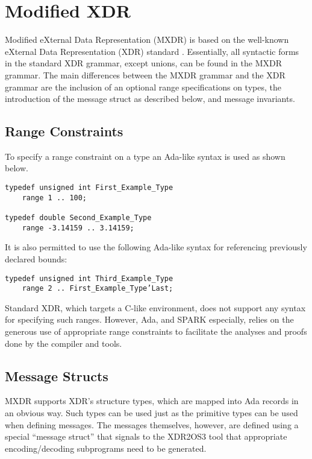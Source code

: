 
\section{Modified XDR}
\label{sec:mxdr}

Modified eXternal Data Representation (MXDR) is based on the well-known eXternal Data
Representation (XDR) standard \cite{rfc-4506}. Essentially, all syntactic forms in the standard
XDR grammar, except unions, can be found in the MXDR grammar. The main differences between the
MXDR grammar and the XDR grammar are the inclusion of an optional range specifications on types,
the introduction of the message struct as described below, and message invariants.


\subsection{Range Constraints}

To specify a range constraint on a type an Ada-like syntax is used as shown below.

\begin{Verbatim}
typedef unsigned int First_Example_Type
    range 1 .. 100;

typedef double Second_Example_Type
    range -3.14159 .. 3.14159;
\end{Verbatim}

It is also permitted to use the following Ada-like syntax for referencing previously declared
bounds:

\begin{Verbatim}
typedef unsigned int Third_Example_Type
    range 2 .. First_Example_Type’Last;
\end{Verbatim}

Standard XDR, which targets a C-like environment, does not support any syntax for specifying
such ranges. However, Ada, and SPARK especially, relies on the generous use of appropriate range
constraints to facilitate the analyses and proofs done by the compiler and tools.

\subsection{Message Structs}

MXDR supports XDR's structure types, which are mapped into Ada records in an obvious way. Such
types can be used just as the primitive types can be used when defining messages. The messages
themselves, however, are defined using a special ``message struct'' that signals to the XDR2OS3
tool that appropriate encoding/decoding subprograms need to be generated.

